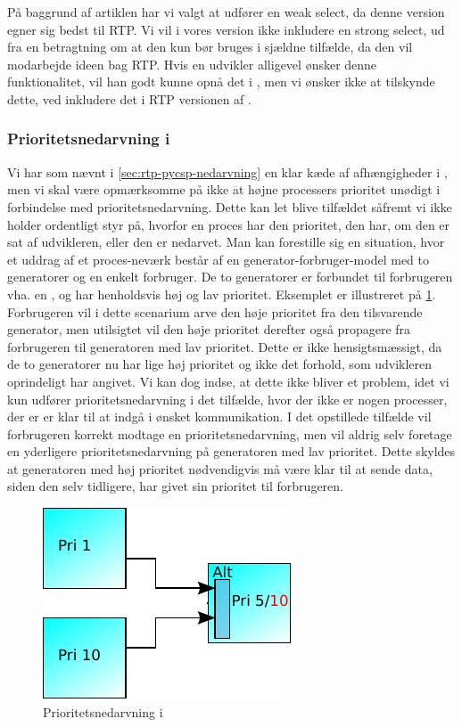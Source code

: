 På baggrund af artiklen har vi valgt at  udfører en weak select, da denne version egner sig bedst til RTP. Vi vil i vores version ikke inkludere en strong select, ud fra en betragtning om at den kun bør bruges i sjældne tilfælde,  da den vil modarbejde ideen bag RTP. Hvis en udvikler alligevel ønsker denne funktionalitet, vil han godt kunne opnå det i \pycsp, men vi ønsker ikke at tilskynde dette, ved inkludere det i RTP versionen af \pycsp.

\subsubsection{Prioritetsnedarvning i }
Vi har som nævnt i \cref{sec:rtp-pycsp-nedarvning} en klar kæde af afhængigheder i \pycsp, men vi skal være opmærksomme på ikke at højne processers prioritet unødigt i forbindelse med prioritetsnedarvning. Dette kan let blive tilfældet såfremt vi ikke holder ordentligt styr på, hvorfor en proces har den prioritet, den har, om den er sat af udvikleren, eller den er nedarvet. Man kan forestille sig en situation, hvor et uddrag af et proces-neværk består af en generator-forbruger-model med to generatorer og en enkelt forbruger. De to generatorer er forbundet til forbrugeren vha. en , og har henholdsvis høj og lav prioritet. Eksemplet er illustreret på \cref{fig:alt-inheritance}. Forbrugeren vil i dette scenarium arve den høje prioritet fra den tilsvarende generator, men utilsigtet vil den høje prioritet derefter også propagere fra forbrugeren til generatoren med lav prioritet. Dette er ikke hensigtsmæssigt, da de to generatorer nu har lige høj prioritet og ikke det forhold, som udvikleren oprindeligt har angivet. Vi kan dog indse, at dette ikke bliver et problem, idet vi kun udfører prioritetsnedarvning i det tilfælde, hvor der ikke er nogen processer, der er er klar til at indgå i ønsket kommunikation. I det opstillede tilfælde vil forbrugeren korrekt modtage en prioritetsnedarvning, men vil aldrig selv foretage en yderligere prioritetsnedarvning på generatoren med lav prioritet. Dette skyldes at generatoren med høj prioritet nødvendigvis må være klar til at sende data, siden den selv tidligere, har givet sin prioritet til forbrugeren.

\begin{figure}
 \begin{center}
  \includegraphics[scale=1.00]{images/alt-inheritance}
  \caption{Prioritetsnedarvning i }
  \label{fig:alt-inheritance}
  \end{center}
\end{figure}
